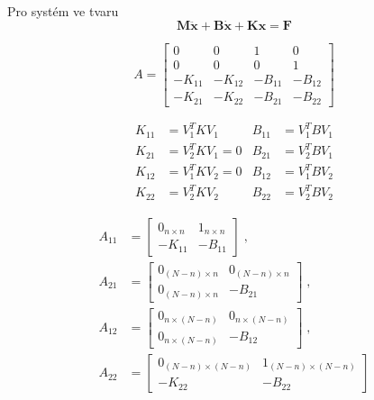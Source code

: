 \documentclass{article}
\begin{document}
	Pro systém ve tvaru
	\begin{equation}
	\bm{M}\bm{\ddot{x}} + \bm{B}\bm{\dot{x}} + \bm{K}\bm{x} = \bm{F}
	\end{equation}

	\begin{equation}
	A
	=
	\begin{bmatrix}
		0 & 0 & 1 & 0 \\
		0 & 0 & 0 & 1 \\
		-K_{11} & -K_{12} & -B_{11} & -B_{12} \\
		-K_{21} & -K_{22} & -B_{21} & -B_{22}
	\end{bmatrix}
\end{equation}

\begin{align}
	K_{11} &= V_1^T K V_1 & 
	B_{11} &= V_1^T B V_1 \\
	K_{21} &= V_2^T K V_1 = 0 &
	B_{21} &= V_2^T B V_1 \\
	K_{12} &= V_1^T K V_2 = 0 &
	B_{12} &= V_1^T B V_2 \\
	K_{22} &= V_2^T K V_2 &
	B_{22} &= V_2^T B V_2 
\end{align}



\begin{align}
	A_{11}
	&=
	\begin{bmatrix}
		0_{n \times n} & 1_{n \times n} \\
		-K_{11} & -B_{11}
	\end{bmatrix}
	\;,\quad \\
	A_{21}
	&=
	\begin{bmatrix}
		0_{(N-n) \times n} & 0_{(N-n) \times n} \\
		0_{(N-n) \times n} & -B_{21}
	\end{bmatrix}
	\;,\quad \\
	A_{12}
	&=
	\begin{bmatrix}
		0_{n \times (N-n)} & 0_{n \times (N-n)} \\
		0_{n \times (N-n)} & -B_{12}
	\end{bmatrix}
	\;,\quad \\
	A_{22}
	&=
	\begin{bmatrix}
		0_{(N-n) \times (N-n)} & 1_{(N-n) \times (N-n)} \\
		-K_{22} & -B_{22}
	\end{bmatrix}
\end{align}
\end{document}
